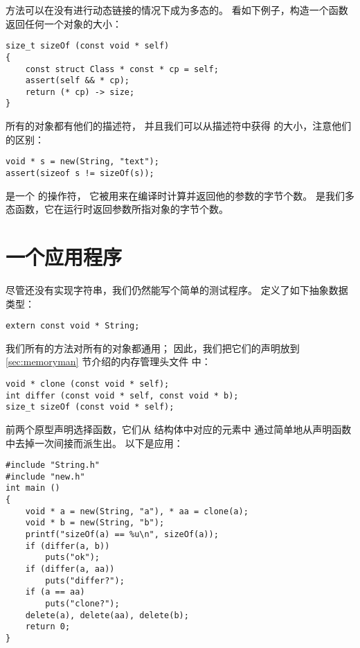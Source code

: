 方法可以在没有进行动态链接的情况下成为多态的。
看如下例子，构造一个函数  返回任何一个对象的大小：

\begin{lstlisting}
size_t sizeOf (const void * self)
{   
    const struct Class * const * cp = self;
    assert(self && * cp);
    return (* cp) -> size;
}
\end{lstlisting}

所有的对象都有他们的描述符，
并且我们可以从描述符中获得  的大小，注意他们的区别：
\begin{lstlisting}
void * s = new(String, "text");
assert(sizeof s != sizeOf(s));
\end{lstlisting}

 是一个  的操作符，
它被用来在编译时计算并返回他的参数的字节个数。
 是我们多态函数，它在运行时返回参数所指对象的字节个数。


\section{一个应用程序}
\label{sec:dlApp}

尽管还没有实现字符串，我们仍然能写个简单的测试程序。
 定义了如下抽象数据类型：
\begin{lstlisting}
extern const void * String;
\end{lstlisting}

我们所有的方法对所有的对象都通用；
因此，我们把它们的声明放到 \ref{sec:memoryman} 节介绍的内存管理头文件
 中：
\begin{lstlisting}
void * clone (const void * self);
int differ (const void * self, const void * b);
size_t sizeOf (const void * self);
\end{lstlisting}

前两个原型声明选择函数，它们从  结构体中对应的元素中
通过简单地从声明函数中去掉一次间接而派生出。
以下是应用：
\begin{lstlisting}
#include "String.h"
#include "new.h"
int main ()
{   
    void * a = new(String, "a"), * aa = clone(a);
    void * b = new(String, "b");
    printf("sizeOf(a) == %u\n", sizeOf(a));
    if (differ(a, b))
        puts("ok");
    if (differ(a, aa))
        puts("differ?");
    if (a == aa)
        puts("clone?");
    delete(a), delete(aa), delete(b);
    return 0;
}
\end{lstlisting}

